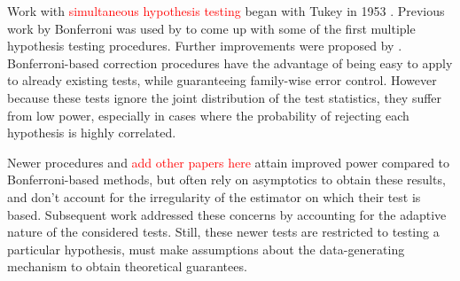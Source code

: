 \documentclass{article}
\newcommand{\sh}{\textcolor{red}}
\begin{document}


Work with \textcolor{red}{simultaneous hypothesis testing}
began with Tukey in 1953 \citep{miller_simultaneous_1981}.  Previous work by Bonferroni was used by \citep{dunn_estimation_1959,dunn_multiple_1961} to come up with some of the first multiple hypothesis testing procedures.  Further improvements were proposed by \citep{hochberg_sharper_1988,holm_simple_1979,s._holland_improved_1988}.  Bonferroni-based correction procedures have the advantage of being easy to apply to already existing tests, while guaranteeing family-wise error control. However because these tests ignore the joint distribution of the test statistics, they suffer from low power, especially in cases where the probability of rejecting each hypothesis is highly correlated. 

Newer procedures \citep{donoho_higher_2004} and \sh{add other papers here} attain improved power compared to Bonferroni-based methods, but often rely on asymptotics to obtain these results, and don't account for the irregularity of the estimator on which their test is based.  Subsequent work \citep{mckeague_adaptive_2015, pan_powerful_2014, xu_adaptive_2016} addressed these concerns by accounting for the adaptive nature of the considered tests. Still, these newer tests are restricted to testing a particular hypothesis, 
must make assumptions about the data-generating mechanism to obtain theoretical guarantees.
\end{document}
